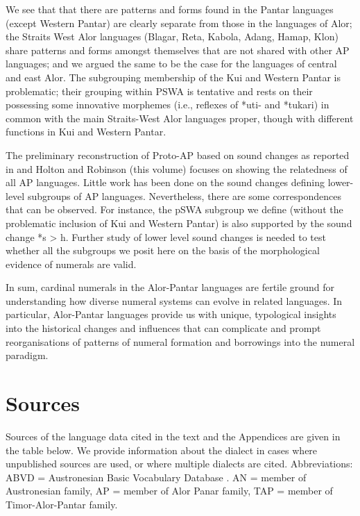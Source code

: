 \documentclass[output=paper]{LSP/langsci}
\begin{document}
We see that that there are patterns and forms found in the Pantar languages (except Western Pantar) are clearly separate from those in the languages of Alor; the Straits West Alor languages (Blagar, Reta, Kabola, Adang, Hamap, Klon) share patterns and forms amongst themselves that are not shared with other AP languages; and we argued the same to be the case for the languages of central and east Alor. The subgrouping membership of the Kui and Western Pantar is problematic; their grouping within PSWA is tentative and rests on their possessing some innovative morphemes (i.e., reflexes of *{\texthtb}uti- and *tukari) in common with the main Straits-West Alor languages proper, though with different functions in Kui and Western Pantar.

The preliminary reconstruction of Proto-AP based on sound changes as reported in \citet{HoltonEtAl2012} and Holton and Robinson (this volume) focuses on showing the relatedness of all AP languages. Little work has been done on the sound changes defining lower-level subgroups of AP languages. Nevertheless, there are some correspondences that can be observed. For instance, the pSWA subgroup we define (without the problematic inclusion of Kui and Western Pantar) is also supported by the sound change *s {\textgreater} h. Further study of lower level sound changes is needed to test whether all the subgroups we posit here on the basis of the morphological evidence of numerals are valid. 

In sum, cardinal numerals in the Alor-Pantar languages are fertile ground for understanding how diverse numeral systems can evolve in related languages. In particular, Alor-Pantar languages provide us with unique, typological insights into the historical changes and influences that can complicate and prompt reorganisations of patterns of numeral formation and borrowings into the numeral paradigm.


\section{Sources} \label{sec:6:9}
Sources of the language data cited in the text and the Appendices are given in the table below. We provide information about the dialect in cases where unpublished sources are used, or where multiple dialects are cited. Abbreviations: ABVD = Austronesian Basic Vocabulary Database \citep{GreenhillEtAl20052007}. AN = member of Austronesian family, AP = member of Alor Panar family, TAP = member of Timor-Alor-Pantar family.
\end{document}
